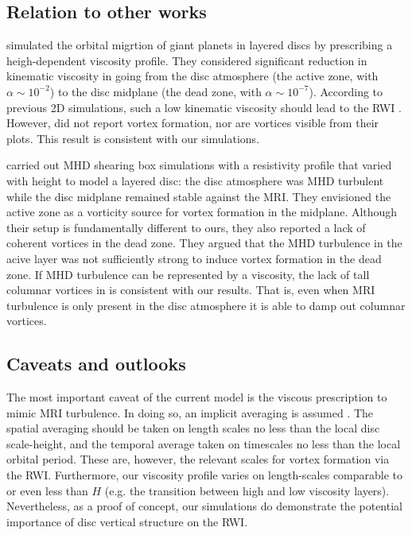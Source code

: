 \subsection{Relation to other works}
\cite{pierens10} simulated the orbital migrtion of giant planets in
layered discs by prescribing a heigh-dependent viscosity profile. They
considered significant reduction in kinematic viscosity in going from
the disc atmosphere (the active zone, with $\alpha\sim10^{-2}$) to the
disc midplane (the dead zone, with $\alpha\sim10^{-7}$). According to
previous 2D simulations, such a low kinematic viscosity should lead to
the RWI \citep{valborro06,valborro07}. However, \citeauthor{pierens10}
did not report vortex formation, nor are vortices visible from their
plots. This result is consistent with our simulations. 

\cite{oishi09} carried out MHD shearing box simulations with 
a resistivity profile that varied with height to model a
layered disc: the disc atmosphere was MHD turbulent while the disc
midplane remained stable against the MRI. They envisioned the active
zone as a vorticity source for vortex formation in the midplane.  
Although their setup is fundamentally different to ours, they also
reported a lack of coherent vortices in the dead zone. They argued
that the MHD turbulence in the acive layer was not sufficiently strong
to induce vortex formation in the dead zone. If MHD turbulence can be
represented by a viscosity, the lack of tall columnar vortices in
\citeauthor{oishi09} is consistent with our results. That is,
even when MRI turbulence is only present in the disc atmosphere it is
able to damp out columnar vortices.     

\subsection{Caveats and outlooks}\label{caveats}

The most important caveat of the current model is the viscous
prescription to mimic MRI turbulence. In doing so, an implicit
averaging is assumed \citep{balbus99}. The spatial averaging should be
taken on length scales no less than the local disc scale-height, and
the temporal average taken on timescales no less than the local
orbital period. These are, however, the relevant scales for vortex
formation via the RWI. Furthermore, our viscosity profile varies on
length-scales comparable to or even less than $H$ (e.g. the transition
between high and low viscosity layers). Nevertheless, as a proof of
concept, our simulations do demonstrate the potential importance of
disc vertical structure on the RWI.   

